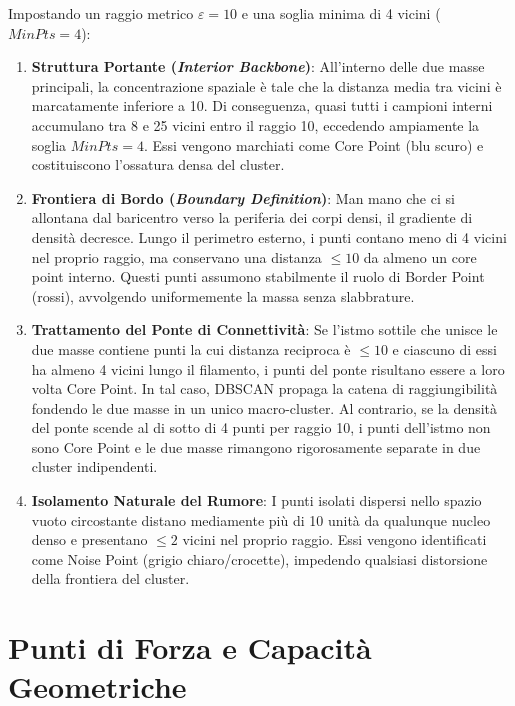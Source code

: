 Impostando un raggio metrico $\varepsilon = 10$ e una soglia minima di 4 vicini ($MinPts = 4$):
\begin{enumerate}
    \item \textbf{Struttura Portante (\textit{Interior Backbone})}:
    All'interno delle due masse principali, la concentrazione spaziale è tale che la distanza media tra vicini è marcatamente inferiore a 10. Di conseguenza, quasi tutti i campioni interni accumulano tra 8 e 25 vicini entro il raggio 10, eccedendo ampiamente la soglia $MinPts = 4$. Essi vengono marchiati come Core Point (blu scuro) e costituiscono l'ossatura densa del cluster.
    
    \item \textbf{Frontiera di Bordo (\textit{Boundary Definition})}:
    Man mano che ci si allontana dal baricentro verso la periferia dei corpi densi, il gradiente di densità decresce. Lungo il perimetro esterno, i punti contano meno di 4 vicini nel proprio raggio, ma conservano una distanza $\le 10$ da almeno un core point interno. Questi punti assumono stabilmente il ruolo di Border Point (rossi), avvolgendo uniformemente la massa senza slabbrature.

    \item \textbf{Trattamento del Ponte di Connettività}:
    Se l'istmo sottile che unisce le due masse contiene punti la cui distanza reciproca è $\le 10$ e ciascuno di essi ha almeno 4 vicini lungo il filamento, i punti del ponte risultano essere a loro volta Core Point. In tal caso, DBSCAN propaga la catena di raggiungibilità fondendo le due masse in un unico macro-cluster. Al contrario, se la densità del ponte scende al di sotto di 4 punti per raggio 10, i punti dell'istmo non sono Core Point e le due masse rimangono rigorosamente separate in due cluster indipendenti.

    \item \textbf{Isolamento Naturale del Rumore}:
    I punti isolati dispersi nello spazio vuoto circostante distano mediamente più di 10 unità da qualunque nucleo denso e presentano $\le 2$ vicini nel proprio raggio. Essi vengono identificati come Noise Point (grigio chiaro/crocette), impedendo qualsiasi distorsione della frontiera del cluster.
\end{enumerate}

\FloatBarrier
\section{Punti di Forza e Capacità Geometriche}
\label{sec:dm-dbscan-strengths}

